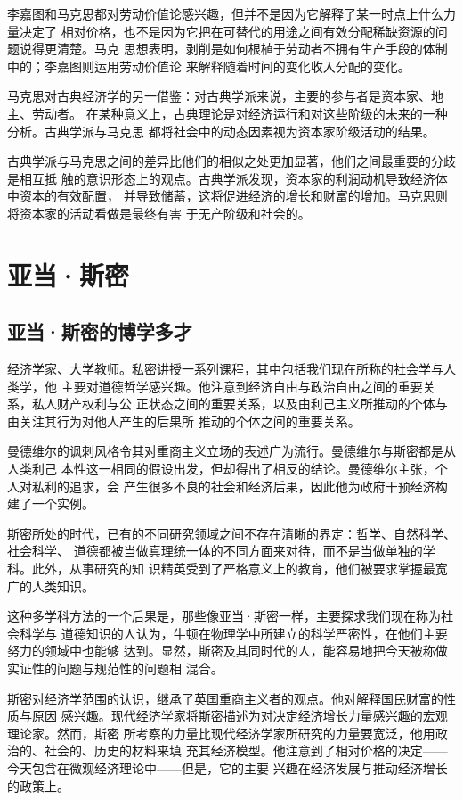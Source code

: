 李嘉图和马克思都对劳动价值论感兴趣，但并不是因为它解释了某一时点上什么力量决定了
相对价格，也不是因为它把在可替代的用途之间有效分配稀缺资源的问题说得更清楚。马克
思想表明，剥削是如何根植于劳动者不拥有生产手段的体制中的；李嘉图则运用劳动价值论
来解释随着时间的变化收入分配的变化。

马克思对古典经济学的另一借鉴：对古典学派来说，主要的参与者是资本家、地主、劳动者。
在某种意义上，古典理论是对经济运行和对这些阶级的未来的一种分析。古典学派与马克思
都将社会中的动态因素视为资本家阶级活动的结果。

古典学派与马克思之间的差异比他们的相似之处更加显著，他们之间最重要的分歧是相互抵
触的意识形态上的观点。古典学派发现，资本家的利润动机导致经济体中资本的有效配置，
并导致储蓄，这将促进经济的增长和财富的增加。马克思则将资本家的活动看做是最终有害
于无产阶级和社会的。

\chapter{亚当·斯密}

\section{亚当·斯密的博学多才}

经济学家、大学教师。私密讲授一系列课程，其中包括我们现在所称的社会学与人类学，他
主要对道德哲学感兴趣。他注意到经济自由与政治自由之间的重要关系，私人财产权利与公
正状态之间的重要关系，以及由利己主义所推动的个体与由关注其行为对他人产生的后果所
推动的个体之间的重要关系。

曼德维尔的讽刺风格令其对重商主义立场的表述广为流行。曼德维尔与斯密都是从人类利己
本性这一相同的假设出发，但却得出了相反的结论。曼德维尔主张，个人对私利的追求，会
产生很多不良的社会和经济后果，因此他为政府干预经济构建了一个实例。

斯密所处的时代，已有的不同研究领域之间不存在清晰的界定：哲学、自然科学、社会科学、
道德都被当做真理统一体的不同方面来对待，而不是当做单独的学科。此外，从事研究的知
识精英受到了严格意义上的教育，他们被要求掌握最宽广的人类知识。

这种多学科方法的一个后果是，那些像亚当·斯密一样，主要探求我们现在称为社会科学与
道德知识的人认为，牛顿在物理学中所建立的科学严密性，在他们主要努力的领域中也能够
达到。显然，斯密及其同时代的人，能容易地把今天被称做实证性的问题与规范性的问题相
混合。

斯密对经济学范围的认识，继承了英国重商主义者的观点。他对解释国民财富的性质与原因
感兴趣。现代经济学家将斯密描述为对决定经济增长力量感兴趣的宏观理论家。然而，斯密
所考察的力量比现代经济学家所研究的力量要宽泛，他用政治的、社会的、历史的材料来填
充其经济模型。他注意到了相对价格的决定——今天包含在微观经济理论中——但是，它的主要
兴趣在经济发展与推动经济增长的政策上。

